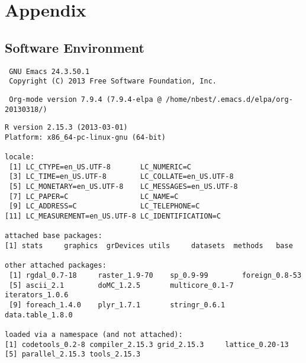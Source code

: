\documentclass[11pt]{article}
\begin{document}
\section{Appendix}
\label{sec-5}
\subsection{Software Environment}
\label{sec-5-1}




\begin{verbatim}
 GNU Emacs 24.3.50.1
 Copyright (C) 2013 Free Software Foundation, Inc.
\end{verbatim}



\begin{verbatim}
 Org-mode version 7.9.4 (7.9.4-elpa @ /home/nbest/.emacs.d/elpa/org-20130318/)
\end{verbatim}




\begin{verbatim}
R version 2.15.3 (2013-03-01)
Platform: x86_64-pc-linux-gnu (64-bit)

locale:
 [1] LC_CTYPE=en_US.UTF-8       LC_NUMERIC=C              
 [3] LC_TIME=en_US.UTF-8        LC_COLLATE=en_US.UTF-8    
 [5] LC_MONETARY=en_US.UTF-8    LC_MESSAGES=en_US.UTF-8   
 [7] LC_PAPER=C                 LC_NAME=C                 
 [9] LC_ADDRESS=C               LC_TELEPHONE=C            
[11] LC_MEASUREMENT=en_US.UTF-8 LC_IDENTIFICATION=C       

attached base packages:
[1] stats     graphics  grDevices utils     datasets  methods   base     

other attached packages:
 [1] rgdal_0.7-18     raster_1.9-70    sp_0.9-99        foreign_0.8-53  
 [5] ascii_2.1        doMC_1.2.5       multicore_0.1-7  iterators_1.0.6 
 [9] foreach_1.4.0    plyr_1.7.1       stringr_0.6.1    data.table_1.8.0

loaded via a namespace (and not attached):
[1] codetools_0.2-8 compiler_2.15.3 grid_2.15.3     lattice_0.20-13
[5] parallel_2.15.3 tools_2.15.3
\end{verbatim}
\end{document}
